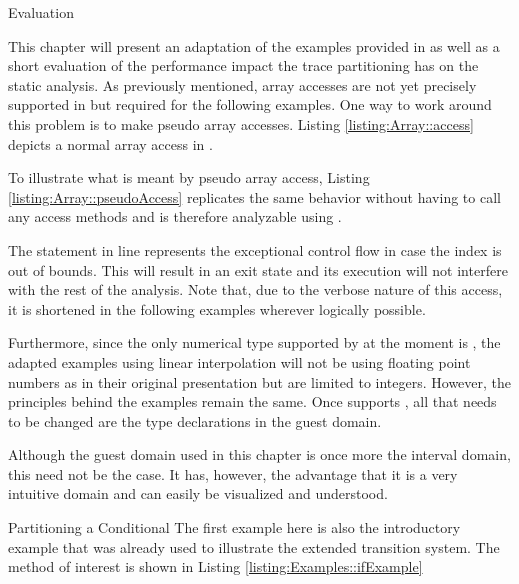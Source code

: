 \begin{chapter}{Evaluation}
	\label{chapter:Evaluation}

	This chapter will present an adaptation of the examples provided in \cite{mauborgne:rival05} as well as a short evaluation of the performance impact the trace partitioning has on the static analysis. As previously mentioned, array accesses are not yet precisely supported in \sample but required for the following examples. One way to work around this problem is to make pseudo array accesses. Listing \ref{listing:Array::access} depicts a normal array access in \scala.
	
	

	To illustrate what is meant by pseudo array access, Listing \ref{listing:Array::pseudoAccess} replicates the same behavior without having to call any access methods and is therefore analyzable using \sample. 

	

	The  statement in line  represents the exceptional control flow in case the index is out of bounds. This will result in an exit state and its execution will not interfere with the rest of the analysis. Note that, due to the verbose nature of this access, it is shortened in the following examples wherever logically possible.

		Furthermore, since the only numerical type supported by \sample at the moment is , the adapted examples using linear interpolation will not be using floating point numbers as in their original presentation but are limited to integers. However, the principles behind the examples remain the same. Once \sample supports , all that needs to be changed are the type declarations in the guest domain.

	Although the guest domain used in this chapter is once more the interval domain, this need not be the case. It has, however, the advantage that it is a very intuitive domain and can easily be visualized and understood.


	\begin{section}{Partitioning a Conditional}
		The first example here is also the introductory example that was already used to illustrate the extended transition system. The method of interest is shown in Listing \ref{listing:Examples::ifExample}
	

\end{section}
\end{chapter}
